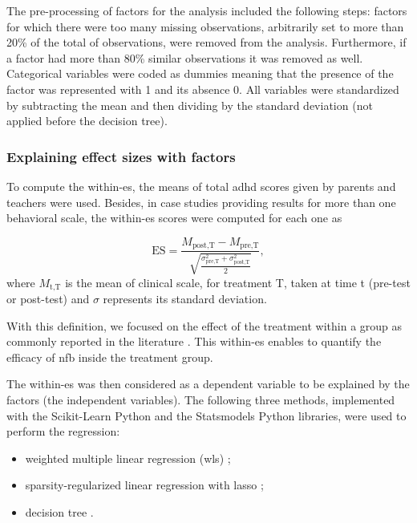 The pre-processing of factors for the analysis included the following steps: factors for which there were too many 
missing observations, arbitrarily set to more than 20\% of the total of observations, were removed from the analysis. 
Furthermore, if a factor had more than 80\% similar observations it was removed as well. Categorical variables were 
coded as dummies meaning that the presence of the factor was represented with 1 and its absence 0. All variables 
were standardized by subtracting the mean and then dividing by the standard deviation (not applied before the decision tree).

\subsubsection{Explaining effect sizes with factors}

To compute the within-\gls{es}, the  means of total \gls{adhd} scores given by parents and teachers were used. Besides, 
in case studies providing results for more than one behavioral scale, the within-\gls{es} scores were computed for each one as 

\begin{equation*}
\label{eq:factors_effect_size_within_subject}
\text{ES} = \frac{M_{\text{post,T}} - M_{\text{pre,T}}}{\sqrt{\frac{\sigma_{\text{pre,T}}^2 + \sigma_{\text{post,T}}^2}{2}}},
\end{equation*} 
\noindent where $M_{\text{t,T}}$ is the mean of clinical scale, for treatment T, taken at time t (pre-test or post-test) and $\sigma$ represents 
its standard deviation.

With this definition, we focused on the effect of the treatment within a group \citep{Cohen1988} as commonly reported 
in the literature \citep{Arns2009, Maurizio2014, Strehl2017}. This within-\gls{es} enables to quantify 
the efficacy of \gls{nfb} inside the treatment group. 

The within-\gls{es} was then considered as a dependent variable to be explained by the factors (the independent variables). 
The following three methods, implemented with the Scikit-Learn Python \citep[version 0.18.1]{Pedregosa2011} and the Statsmodels Python
\citep[version 0.8.0]{Seabold2010} libraries, were used to perform the regression:
\begin{itemize}
  \item weighted multiple linear regression (\gls{wls}) \citep{Montgomery2012};
	\item sparsity-regularized linear regression with \gls{lasso} \citep{Tibshirani1996};
	\item decision tree \citep{Quinlan1986}.
\end{itemize}

